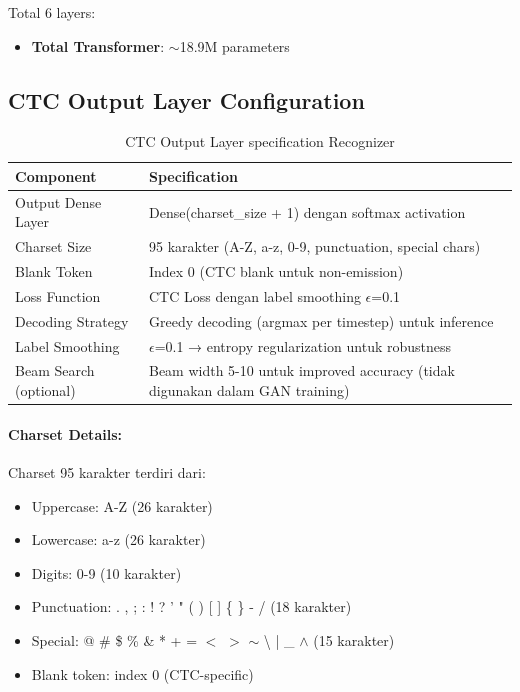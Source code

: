 Total 6 layers:
\begin{itemize}[nosep]
    \item \textbf{Total Transformer}: $\sim$18.9M parameters
\end{itemize}


\subsection{CTC Output Layer Configuration}
\label{appendix:recognizer-ctc}

\begin{table}[H]
\centering
\caption{CTC Output Layer specification Recognizer}
\label{tab:appendix-recognizer-ctc}
\small
\begin{tabular}{|l|p{10cm}|}
\hline
\textbf{Component} & \textbf{Specification} \\
\hline
Output Dense Layer & Dense(charset\_size + 1) dengan softmax activation \\
\hline
Charset Size & 95 karakter (A-Z, a-z, 0-9, punctuation, special chars) \\
\hline
Blank Token & Index 0 (CTC blank untuk non-emission) \\
\hline
Loss Function & CTC Loss dengan label smoothing $\epsilon$=0.1 \\
\hline
Decoding Strategy & Greedy decoding (argmax per timestep) untuk inference \\
\hline
Label Smoothing & $\epsilon$=0.1 → entropy regularization untuk robustness \\
\hline
Beam Search (optional) & Beam width 5-10 untuk improved accuracy (tidak digunakan dalam GAN training) \\
\hline
\end{tabular}
\end{table}

\paragraph{Charset Details:}

Charset 95 karakter terdiri dari:
\begin{itemize}[nosep]
    \item Uppercase: A-Z (26 karakter)
    \item Lowercase: a-z (26 karakter)
    \item Digits: 0-9 (10 karakter)
    \item Punctuation: . , ; : ! ? ' " ( ) [ ] \{ \} - / (18 karakter)
    \item Special: @ \# \$ \% \& * + = $<$ $>$ $\sim$ \textbackslash{} | \_ $\wedge$ (15 karakter)
    \item Blank token: index 0 (CTC-specific)
\end{itemize}

